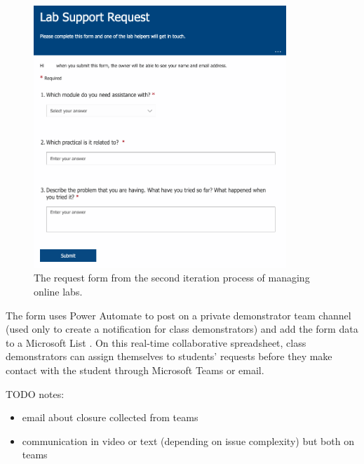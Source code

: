 \documentclass[a4paper,11pt]{article}
\begin{document}
\FloatBarrier
\begin{figure}[H]
  \centering
  \includegraphics[width=0.85\textwidth]{teams2a.png}
  \caption{The request form from the second iteration process of managing online labs.}
\end{figure}

The form uses Power Automate \cite{pauto} to post on a private demonstrator team channel (used only to create a notification for class demonstrators) and add the form data to a Microsoft List \cite{lists}. On this real-time collaborative spreadsheet, class demonstrators can assign themselves to students' requests before they make contact with the student through Microsoft Teams \cite{teams} or email. 

TODO notes:
\begin{itemize}
  \item email about closure collected from teams
  \item communication in video or text (depending on issue complexity) but both on teams
\end{itemize}
\end{document}
